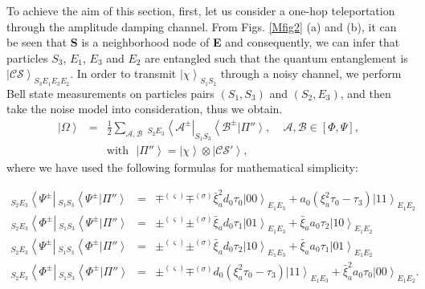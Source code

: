 \documentclass[aps,pra,twocolumn,showpacs,superscriptaddress,groupedaddress]{revtex4}
\begin{document}
To achieve the aim of this section, first, let us consider a one-hop teleportation through the amplitude damping channel. From Figs. \ref{Mfig2} (a) and (b), it can be seen that {\bf S} is a neighborhood node of {\bf E} and consequently, we can infer that particles $S_3$, $E_1$, $E_3$ and $E_2$ are entangled such that the quantum entanglement is $\left|\mathcal{CS}\right\rangle_{S_3E_1E_3E_2}$. In order to transmit $\left|\chi\right\rangle_{S_1S_2}$ through a noisy channel, we perform Bell state measurements on particles pairs $(S_1,S_3)$ and $(S_2,E_3)$, and then take the noise model into consideration, thus we obtain.
\begin{eqnarray}
\left|\Omega\right\rangle&=&\frac{1}{2}\sum_{\mathcal{A},\mathcal{B}}\ _{S_2E_3}\left\langle\mathcal{A}^{\pm}\right| _{S_1S_3}\left\langle\mathcal{B}^{\pm}\right.\left|\Pi''\right\rangle,\ \ \ \ \ \mathcal{A},\mathcal{B}\in\left[\Phi,\Psi\right],\nonumber\\
&&\mbox{with}\ \ \ \left|\Pi''\right\rangle=\left|\chi\right\rangle\otimes\left|\mathcal{CS'}\right\rangle,
\label{SUS5}
\end{eqnarray}
where we have used the following formulas for mathematical simplicity:
\begin{widetext}
\begin{eqnarray}
_{S_2E_3}\left\langle\Psi^{\pm}\right|\ _{S_1S_3}\left\langle\Psi^{\pm}\right.\left|\Pi''\right\rangle&=&\mp^{(\varsigma)}\mp^{(\sigma)}\bar{\xi}_a^2d_0\tau_0\left|00\right\rangle_{E_1E_3}+a_0\left(\xi_a^2\tau_0-\tau_3\right)\left|11\right\rangle_{E_1E_2}\nonumber\\
_{S_2E_3}\left\langle\Phi^{\pm}\right|\ _{S_1S_3}\left\langle\Psi^{\pm}\right.\left|\Pi''\right\rangle&=&\pm^{(\varsigma)}\pm^{(\sigma)}\bar{\xi}_ad_0\tau_1\left|01\right\rangle_{E_1E_3}+\bar{\xi}_aa_0\tau_2\left|10\right\rangle_{E_1E_2}\nonumber\\
_{S_2E_3}\left\langle\Psi^{\pm}\right|\ _{S_1S_3}\left\langle\Phi^{\pm}\right.\left|\Pi''\right\rangle&=&\pm^{(\varsigma)}\pm^{(\sigma)}\bar{\xi}_ad_0\tau_2\left|10\right\rangle_{E_1E_3}+\bar{\xi}_aa_0\tau_1\left|01\right\rangle_{E_1E_2}\nonumber\\
_{S_2E_3}\left\langle\Phi^{\pm}\right|\ _{S_1S_3}\left\langle\Phi^{\pm}\right.\left|\Pi''\right\rangle&=&\pm^{(\varsigma)}\mp^{(\sigma)}d_0\left(\xi_a^2\tau_0-\tau_3\right)\left|11\right\rangle_{E_1E_3}+\bar{\xi}_a^2a_0\tau_0\left|00\right\rangle_{E_1E_2}.
\label{SUS6}
\end{eqnarray}
\end{widetext}
\end{document}
